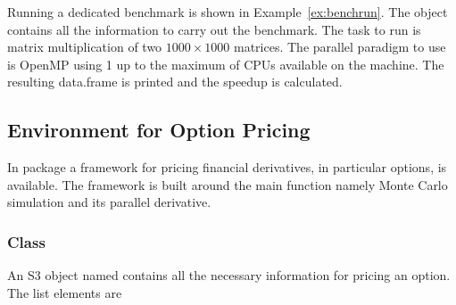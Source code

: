 \begin{Example}
Running a dedicated benchmark is shown in
Example~\ref{ex:benchrun}. The object  contains all the
information to carry out the benchmark. The task to run is matrix
multiplication of two $1000 \times 1000$ matrices. The parallel
paradigm to use is OpenMP using 1 up to the maximum of CPUs available
on the machine. The resulting data.frame is printed and the speedup is
calculated.

\subsection{Environment for Option Pricing}

In package  a framework for pricing financial derivatives,
in particular options, is available. The framework is built around the
main function namely Monte Carlo simulation and its parallel
derivative. 

\subsubsection{Class }

An S3 object named  contains all
the necessary information for pricing an option. The list elements are




\end{Example}
